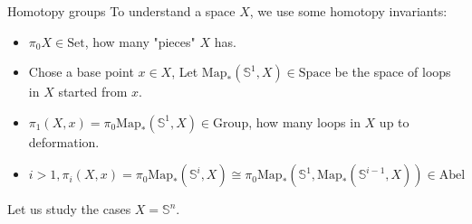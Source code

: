 \documentclass[12pt]{beamer}
\begin{document}
\begin{frame}{Homotopy groups}
To understand a space $X$, we use some homotopy invariants:

\begin{itemize}
  \item $\pi_0 X \in \mathrm{Set} $, how many "pieces" $X$ has. 
    \pause
  \item Chose a base point $x\in X$, Let $ \mathrm{Map}_*(\mathbb{S}^1,X) \in \mathrm{Space}$ be the space of loops in $X$ started from $x$. 
    \pause
  \item $ \pi_1(X,x)= \pi_0\mathrm{Map}_*(\mathbb{S}^1,X) \in \mathrm{Group}$, how many loops in $X$ up to deformation.
    \pause
  \item $i>1, \pi_i(X,x)= \pi_0\mathrm{Map}_*(\mathbb{S}^i,X)\cong \pi_0\mathrm{Map}_*(\mathbb{S}^1,\mathrm{Map}_*(\mathbb{S}^{i-1},X)) \in \mathrm{Abel}$
\end{itemize}
\pause
Let us study the cases $X=\mathbb{S}^n$.
\end{frame}
\end{document}

